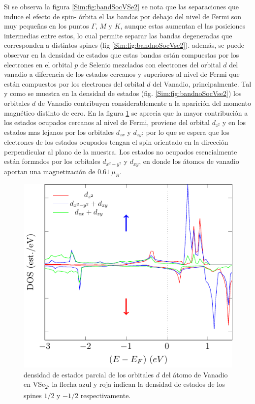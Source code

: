\newline
Si se observa la figura \ref{Sim:fig:bandSocVSe2} se nota que las separaciones que induce el efecto de spin- \'orbita el las bandas por debajo del nivel de Fermi  son muy peque\~nas en los puntos $\Gamma$, $M$ y $K$, aunque estas aumentan el las posiciones intermedias entre estos, lo cual   permite separar las bandas degeneradas que corresponden a distintos spines (fig \ref{Sim:fig:bandnoSocVse2}). adem\'as, se puede observar en la densidad de estados que estas bandas est\'an compuestas por los electrones en el orbital $p$ de Selenio mezclados con electrones del orbital $d$ del vanadio a diferencia de   los estados cercanos y superiores al nivel de Fermi  que est\'an compuestos por los electrones del orbital $d$ del Vanadio, principalmente. Tal y como se muestra en la densidad de estados (fig. \ref{Sim:fig:bandnoSocVse2}) los orbitales $d$ de Vanadio contribuyen  considerablemente a la aparici\'on del momento magn\'etico distinto de cero. En la figura \ref{Sim:fig:pDOSvVse2} se aprecia que la mayor contribuci\'on a los estados ocupados cercanos al nivel de Fermi, proviene del orbital $d_{z^2}$ y en los estados mas lejanos por los orbitales $d_{zx}$ y $d_{zy}$; por lo que se espera que los electrones de los estados ocupados tengan el spin orientado en la direcci\'on perpendicular al plano de la muestra. Los estados no ocupados esencialmente est\'an formados por los orbitales $d_{x^2 -y^2}$ y $d_{xy}$, en donde los \'atomos de vanadio aportan una magnetizaci\'on de $0.61~ \mu_{B}$.   
\begin{figure}[!hbt]
	\centering
	\includegraphics[scale=1]{figRes/VSe2/bandas/celU/nosoc/pdosV.pdf}
	\caption[Densidad de estados proyectada de los orbitales $d$ del vanadio en VSe\textsubscript{2}.]{densidad de estados parcial de los orbitales $d$ del \'atomo de Vanadio en VSe\textsubscript{2}, la flecha azul y roja indican la densidad de estados de los spines $1/2$ y $-1/2$ respectivamente.}
	\label{Sim:fig:pDOSvVse2}
\end{figure}
